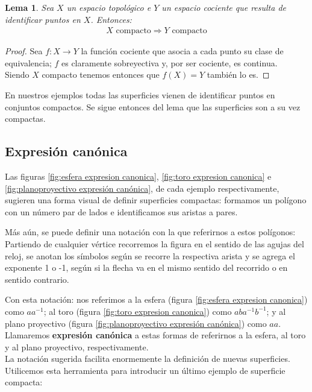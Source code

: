 \documentclass[a4paper,11pt,spanish, twoside, leqno]{tfg-uam}
\newtheorem{lema}[teor]{Lema}
\theoremstyle{definition}
\begin{document}
\begin{lema}\label{lema:compacidadDePoligonos}
	Sea $X$ un espacio topológico e $Y$  un espacio cociente que resulta de identificar puntos en $X$. Entonces:
	\begin{align*}
	\text{$X$ compacto}\Rightarrow\text{$Y$ compacto}
	\end{align*}
\end{lema}
\begin{proof}
	Sea $f:X\longrightarrow Y$ la función cociente que asocia a cada punto su clase de equivalencia; $f$ es claramente sobreyectiva y, por ser cociente, es continua.\\
	Siendo $X$ compacto tenemos entonces que $f(X)=Y$ también lo es.
\end{proof}
En nuestros ejemplos todas las superficies vienen de identificar puntos en conjuntos compactos. Se sigue entonces del lema que las superficies son a su vez compactas.

\subsection*{Expresión canónica}

Las figuras \ref{fig:esfera expresion canonica}, \ref{fig:toro expresion canonica} e \ref{fig:planoproyectivo expresión canónica}, de cada ejemplo respectivamente, sugieren una forma visual de definir superficies compactas: formamos un polígono con un número par de lados e identificamos sus aristas a pares. 

Más aún, se puede definir una notación con la que referirnos a estos polígonos: \\
Partiendo de cualquier vértice recorremos la figura en el sentido de las agujas del reloj, se anotan los símbolos según se recorre la respectiva arista y se agrega el exponente 1 o -1, según si la flecha va en el mismo sentido del recorrido o en sentido contrario.

Con esta notación: nos referimos  a la esfera (figura \ref{fig:esfera expresion canonica}) como $ aa^{-1} $; al toro (figura \ref{fig:toro expresion canonica})  como $ aba^{-1}b^{-1} $; y al plano proyectivo (figura \ref{fig:planoproyectivo expresión canónica}) como $ aa $. Llamaremos \textbf{expresión canónica} a estas formas de referirnos a la esfera, al toro y al plano proyectivo, respectivamente.
\\

La notación sugerida facilita enormemente la definición de nuevas superficies. Utilicemos esta herramienta para introducir un último ejemplo de superficie compacta:
\end{document}
